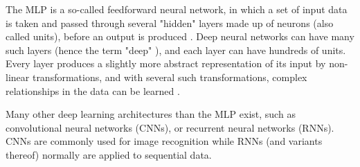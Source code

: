 The MLP is a so-called feedforward neural network, in which a set of input data is taken and passed through several "hidden" layers made up of neurons (also called units), before an output is produced \cite{LeCun2015}.
Deep neural networks can have many such layers (hence the term "deep" \cite{Chollet2017}), and each layer can have hundreds of units. Every layer produces a slightly more abstract representation of its input by non-linear transformations, and with several such transformations, complex relationships in the data can be learned \cite{LeCun2015}.



Many other deep learning architectures than the MLP exist, such as convolutional neural networks (CNNs), or recurrent neural networks (RNNs). CNNs are commonly used for image recognition while RNNs (and variants thereof) normally are applied to sequential data. 

